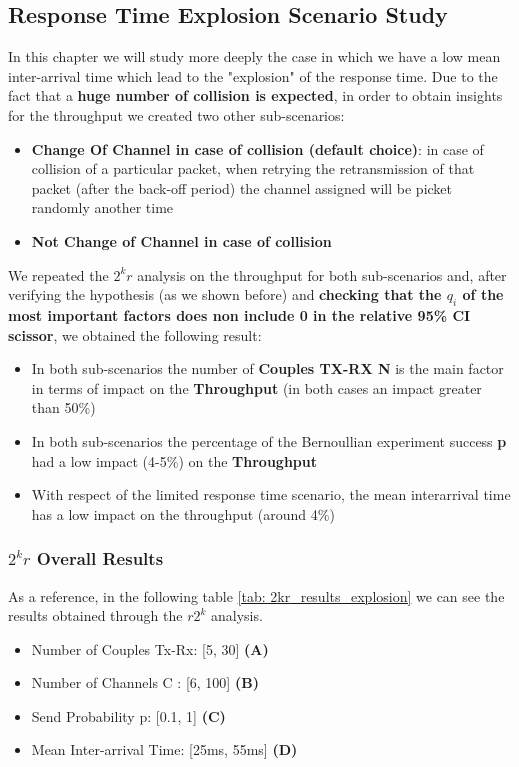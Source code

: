 \subsection{Response Time Explosion Scenario Study}
In this chapter we will study more deeply the case in which we have a low mean inter-arrival time which lead to the "explosion" of the response time. Due to the fact that a \textbf{huge number of collision is expected}, in order to obtain insights for the throughput we created two other sub-scenarios: 
\begin{itemize}
	\item \textbf{Change Of Channel in case of collision (default choice)}: in case of collision of a particular packet, when retrying the retransmission of that packet (after the back-off period) the channel assigned will be picket randomly another time
	\item \textbf{Not Change of Channel in case of collision}
\end{itemize}
We repeated the $2^{k}r$ analysis on the throughput for both sub-scenarios and, after verifying the hypothesis (as we shown before) and \textbf{checking that the $q_{i}$ of the most important factors does non include 0 in the relative 95\% CI scissor}, we obtained the following result:
\begin{itemize}
	\item In both sub-scenarios the number of \textbf{Couples TX-RX N} is the main factor in terms of impact on the \textbf{Throughput} (in both cases an impact greater than 50\%)
	\item In both sub-scenarios the percentage of the Bernoullian experiment success \textbf{p} had a low impact (4-5\%) on the \textbf{Throughput}
	\item With respect of the limited response time scenario, the mean interarrival time has a low impact on the throughput (around 4\%) 
\end{itemize}
\subsubsection{$2^kr$ Overall Results}
As a reference, in the following table \ref{tab: 2kr_results_explosion} we can see the results obtained through the $r2^k$ analysis.

\begin{itemize}
	\item Number of Couples Tx-Rx: [5, 30] \textbf{(A)}
	\item Number of Channels C : [6, 100] \textbf{(B)}
	\item Send Probability p: [0.1, 1] \textbf{(C)}
	\item Mean Inter-arrival Time: [25ms, 55ms] \textbf{(D)}    
\end{itemize}

